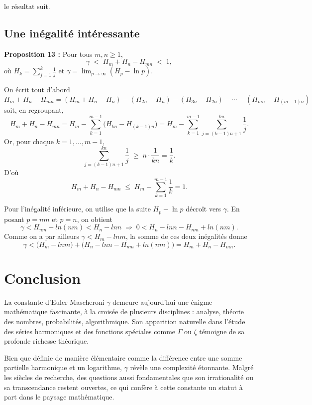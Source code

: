\documentclass[a4paper,12pt]{article}
\begin{document}
le résultat suit.


\subsection{Une inégalité intéressante}

\textbf{Proposition 13 : }Pour tous \(m,n\ge1\),
\[
\gamma \;<\; H_m + H_n - H_{mn} \;<\; 1,
\]
où \(H_k=\sum_{j=1}^k\frac1j\) et \(\gamma=\lim_{p\to\infty}(H_p - \ln p)\).

\medskip

On écrit tout d’abord
\[
H_m + H_n - H_{mn}
= (H_m + H_n - H_n)
  - (H_{2n}-H_n) - (H_{3n}-H_{2n}) - \cdots - (H_{mn}-H_{(m-1)n})
\]
soit, en regroupant,
\[
H_m + H_n - H_{mn}
= H_m
  - \sum_{k=1}^{m-1}\bigl(H_{kn} - H_{(k-1)n}\bigr)
= H_m
  - \sum_{k=1}^{m-1}\sum_{j=(k-1)n+1}^{kn}\frac1j.
\]
Or, pour chaque \(k=1,\dots,m-1\),
\[
\sum_{j=(k-1)n+1}^{kn}\frac1j
\;\ge\;
n\cdot\frac1{kn}
=\frac1k.
\]
D’où
\[
H_m + H_n - H_{mn}
\;\le\;
H_m - \sum_{k=1}^{m-1}\frac1k
=1.
\]

Pour l’inégalité inférieure, on utilise que la suite \(H_p - \ln p\) décroît vers \(\gamma\).  
En posant \(p=nm\) et \(p=n\), on obtient
\[
\gamma < H_{nm} - ln(nm) < H_n - ln n
\;\Longrightarrow\;
0 < H_n - ln n - H_{nm} + ln(nm).
\]
Comme on a par ailleurs \(\gamma < H_m - ln m\), la somme de ces deux inégalités donne
\[
\gamma
< \bigl(H_m - ln m\bigr)
  + \bigl(H_n - ln n - H_{nm} + ln(nm)\bigr)
= H_m + H_n - H_{mn}.
\]

\newpage

\section*{Conclusion}

La constante d’Euler-Mascheroni \(\gamma\) demeure aujourd’hui une énigme mathématique fascinante, à la croisée de plusieurs disciplines : analyse, théorie des nombres, probabilités, algorithmique. Son apparition naturelle dans l’étude des séries harmoniques et des fonctions spéciales comme \(\Gamma\) ou \(\zeta\) témoigne de sa profonde richesse théorique.

Bien que définie de manière élémentaire comme la différence entre une somme partielle harmonique et un logarithme, \(\gamma\) révèle une complexité étonnante. Malgré les siècles de recherche, des questions aussi fondamentales que son irrationalité ou sa transcendance restent ouvertes, ce qui confère à cette constante un statut à part dans le paysage mathématique.
\end{document}
